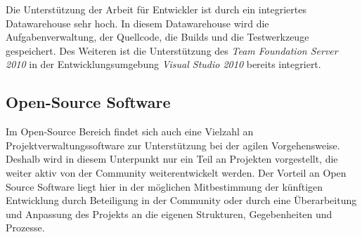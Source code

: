 \begin{description}
\begin{itemize}
\end{itemize}

Die Unterstützung der Arbeit für Entwickler ist durch ein integriertes Datawarehouse sehr hoch. In diesem Datawarehouse wird die Aufgabenverwaltung, der Quellcode, die Builds und die Testwerkzeuge gespeichert. Des Weiteren ist die Unterstützung des \emph{Team Foundation Server 2010} in der Entwicklungsumgebung \emph{Visual Studio 2010} bereits integriert. \cite{bib:tfs2010} \cite{bib:tfsheise} \\

\end{description}

\subsection{Open-Source Software}
Im Open-Source Bereich findet sich auch eine Vielzahl an Projektverwaltungssoftware zur Unterstützung bei der agilen Vorgehensweise. Deshalb wird in diesem Unterpunkt nur ein Teil an Projekten vorgestellt, die weiter aktiv von der Community weiterentwickelt werden. Der Vorteil an Open Source Software liegt hier in der möglichen Mitbestimmung der künftigen Entwicklung durch Beteiligung in der Community oder durch eine Überarbeitung und Anpassung des Projekts an die eigenen Strukturen, Gegebenheiten und Prozesse.
